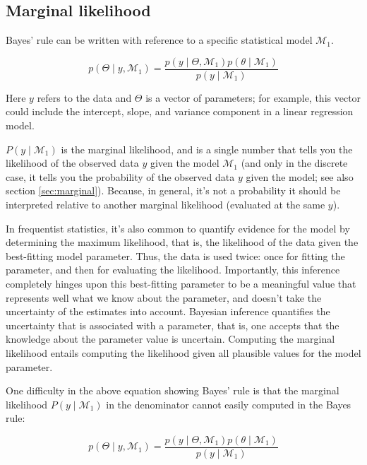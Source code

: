 \documentclass[12pt,]{krantz}
\theoremstyle{definition}
\theoremstyle{definition}
\theoremstyle{definition}
\theoremstyle{remark}
\begin{document}
\subsection{Marginal likelihood}\label{marginal-likelihood}

Bayes' rule can be written with reference to a specific statistical
model \(\mathcal{M}_1\).

\begin{equation}
p(\Theta \mid y, \mathcal{M}_1) = \frac{p(y \mid \Theta, \mathcal{M}_1) p(\theta \mid \mathcal{M}_1)}{p(y \mid \mathcal{M}_1)}
\end{equation}

Here \(y\) refers to the data and \(\Theta\) is a vector of parameters;
for example, this vector could include the intercept, slope, and
variance component in a linear regression model.

\(P(y \mid \mathcal{M}_1)\) is the marginal likelihood, and is a single
number that tells you the likelihood of the observed data \(y\) given
the model \(\mathcal{M}_1\) (and only in the discrete case, it tells you
the probability of the observed data \(y\) given the model; see also
section \ref{sec:marginal}). Because, in general, it's not a probability
it should be interpreted relative to another marginal likelihood
(evaluated at the same \(y\)).

In frequentist statistics, it's also common to quantify evidence for the
model by determining the maximum likelihood, that is, the likelihood of
the data given the best-fitting model parameter. Thus, the data is used
twice: once for fitting the parameter, and then for evaluating the
likelihood. Importantly, this inference completely hinges upon this
best-fitting parameter to be a meaningful value that represents well
what we know about the parameter, and doesn't take the uncertainty of
the estimates into account. Bayesian inference quantifies the
uncertainty that is associated with a parameter, that is, one accepts
that the knowledge about the parameter value is uncertain. Computing the
marginal likelihood entails computing the likelihood given all plausible
values for the model parameter.

One difficulty in the above equation showing Bayes' rule is that the
marginal likelihood \(P(y \mid \mathcal{M}_1)\) in the denominator
cannot easily computed in the Bayes rule:

\begin{equation}
p(\Theta \mid y, \mathcal{M}_1)  = \frac{p(y \mid \Theta, \mathcal{M}_1) p(\theta \mid \mathcal{M}_1)}{p(y \mid \mathcal{M}_1)}
\end{equation}
\end{document}

